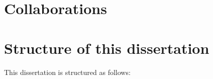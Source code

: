 
    


\section{Collaborations}\label{sec:intro-collabs}

\section{Structure of this dissertation}\label{sec:intro-structure}
This dissertation is structured as follows:

